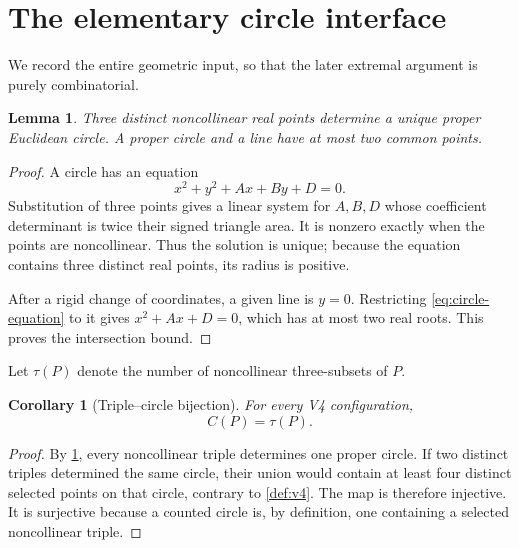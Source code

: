 \documentclass[11pt]{article}
\newtheorem{lemma}[theorem]{Lemma}
\newtheorem{corollary}[theorem]{Corollary}
\theoremstyle{definition}
\theoremstyle{remark}
\begin{document}
\section{The elementary circle interface}

We record the entire geometric input, so that the later extremal argument
is purely combinatorial.

\begin{lemma}\label{lem:circle-interface}
Three distinct noncollinear real points determine a unique proper Euclidean
circle.  A proper circle and a line have at most two common points.
\end{lemma}

\begin{proof}
A circle has an equation
\begin{equation}\label{eq:circle-equation}
 x^2+y^2+Ax+By+D=0.
\end{equation}
Substitution of three points gives a linear system for \(A,B,D\) whose
coefficient determinant is twice their signed triangle area.  It is
nonzero exactly when the points are noncollinear.  Thus the solution is
unique; because the equation contains three distinct real points, its
radius is positive.

After a rigid change of coordinates, a given line is \(y=0\).  Restricting
\eqref{eq:circle-equation} to it gives \(x^2+Ax+D=0\), which has at most two
real roots.  This proves the intersection bound.
\end{proof}

Let \(\tau(P)\) denote the number of noncollinear three-subsets of \(P\).

\begin{corollary}[Triple--circle bijection]\label{cor:triple-circle}
For every V4 configuration,
\begin{equation}\label{eq:circle-triple-bijection}
 C(P)=\tau(P).
\end{equation}
\end{corollary}

\begin{proof}
By \cref{lem:circle-interface}, every noncollinear triple determines one
proper circle.  If two distinct triples determined the same circle, their
union would contain at least four distinct selected points on that circle,
contrary to \cref{def:v4}.  The map is therefore injective.  It is
surjective because a counted circle is, by definition, one containing a
selected noncollinear triple.
\end{proof}
\end{document}
